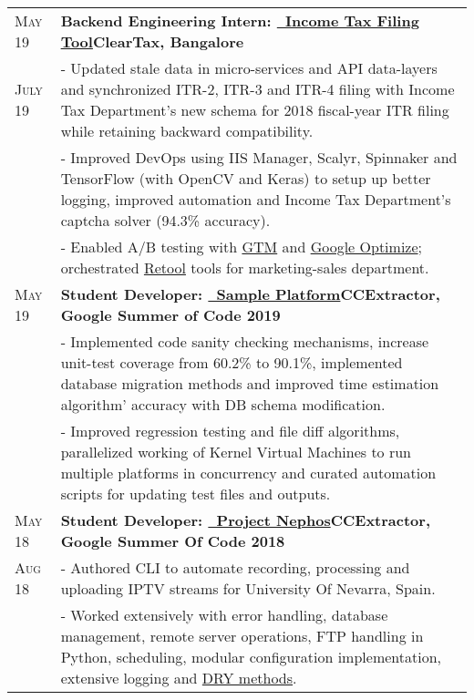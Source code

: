 \documentclass[a4paper,10pt]{extarticle} %
\begin{document}
\begin{tabularx}{\linewidth}{ l | X }

\textsc{May 19} & \textbf{Backend Engineering Intern: {\href{https://cleartax.in/income-tax-efiling}{\ Income Tax Filing Tool}}}\hfill\textbf{ClearTax, Bangalore}\\
\textsc{July 19}& {- Updated stale data in micro-services and API data-layers and synchronized ITR-2, ITR-3 and ITR-4 filing with Income Tax Department's new schema for 2018 fiscal-year ITR filing while retaining backward compatibility.}\\
& {- Improved DevOps using IIS Manager, Scalyr, Spinnaker and TensorFlow (with OpenCV and Keras) to setup up better logging, improved automation and Income Tax Department's captcha solver (94.3\% accuracy).}\\
& {- Enabled A/B testing with \href{https://tagmanager.google.com/}{GTM} and \href{https://optimize.google.com/optimize/home/}{Google Optimize}; orchestrated \href{https://tryretool.com/}{Retool} tools for marketing-sales department.}\\[2mm]

\textsc{May 19} & \textbf{Student Developer: {\href{https://github.com/CCExtractor/sample-platform}{\ Sample Platform}}}\hfill\textbf{CCExtractor, Google Summer of Code 2019}\\
& {- Implemented code sanity checking mechanisms, increase unit-test coverage from 60.2\% to 90.1\%, implemented database migration methods and improved time estimation algorithm' accuracy with DB schema modification.}\\
& {- Improved regression testing and file diff algorithms, parallelized working of Kernel Virtual Machines to run multiple platforms in concurrency and curated automation scripts for updating test files and outputs.}\\[2mm]

\textsc{May 18} & \textbf{Student Developer: {\href{https://github.com/thealphadollar/Nephos}{\ Project Nephos}}}\hfill\textbf{CCExtractor, Google Summer Of Code 2018}\\
\textsc{Aug 18}& {- Authored CLI to automate recording, processing and uploading IPTV streams for University Of Nevarra, Spain.}\\
& {- Worked extensively with error handling, database management, remote server operations, FTP handling in Python, scheduling, modular configuration implementation, extensive logging and \href{https://thealphadollar.me/learning/2019/05/13/go-dry.html}{DRY methods}.}\\[2mm]


\end{tabularx}
\end{document}
